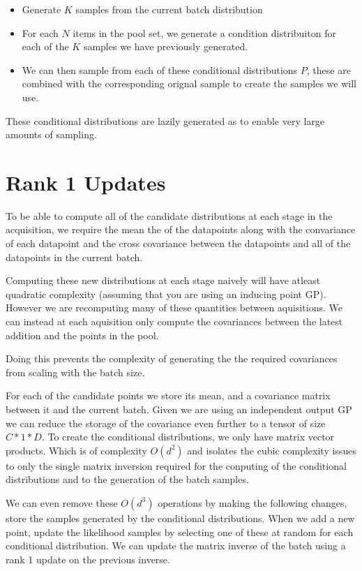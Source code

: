 \documentclass[12pt, a4paper]{report}
\theoremstyle{definition}
\begin{document}
\begin{itemize}
    \item Generate $K$ samples from the current batch distribution
    \item For each $N$ items in the pool set, we generate a condition distribuiton for each of the $K$ samples we have previously generated.
    \item We can then sample from each of these conditional distributions $P$, these are combined with the corresponding orignal sample to create the samples we will use.
\end{itemize}

These conditional distributions are lazily generated as to enable very large amounts of sampling.

\section{Rank 1 Updates}
To be able to compute all of the candidate distributions at each stage in the acquisition, we require the mean the of the datapoints along with the convariance of each datapoint and the cross covariance between the datapoints and all of the datapoints in the current batch.

Computing these new distributions at each stage naively will have atleast quadratic complexity (assuming that you are using an inducing point GP). However we are recomputing many of these quantities between aquisitions. We can instead at each aquisition only compute the covariances between the latest addition and the points in the pool.

Doing this prevents the complexity of generating the the required covariances from scaling with the batch size.

For each of the candidate points we store its mean, and a covariance matrix between it and the current batch. Given we are using an independent output GP we can reduce the storage of the covariance even further to a tensor of size $C * 1 * D$. To create the conditional distributions, we only have matrix vector products. Which is of complexity $O(d^2)$ and isolates the cubic complexity issues to only the single matrix inversion required for the conputing of the conditional distributions and to the generation of the batch samples.

We can even remove these $O(d^3)$ operations by making the following changes, store the samples generated by the conditional distributions. When we add a new point, update the likelihood samples by selecting one of these at random for each conditional distribution. We can update the matrix inverse of the batch using a rank 1 update on the previous inverse.
\end{document}
